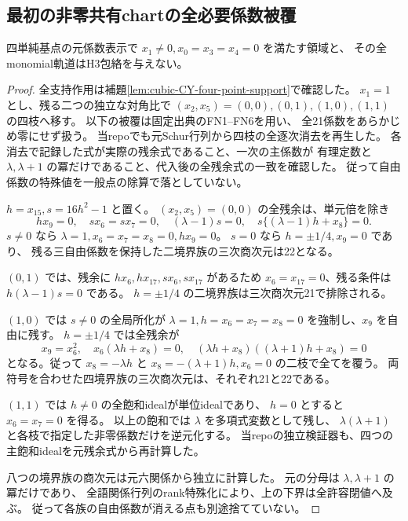 \subsection{最初の非零共有chartの全必要係数被覆}
\label{subsec:cubic-CY-four-point-first-cover}
\begin{theorem}\label{thm:cubic-CY-four-point-first-empty}
四単純基点の元係数表示で $x_1\ne0,x_0=x_3=x_4=0$ を満たす領域と、
その全monomial軌道はH3包絡を与えない。
\end{theorem}
\begin{proof}
全支持作用は補題\ref{lem:cubic-CY-four-point-support}で確認した。
$x_1=1$ とし、残る二つの独立な対角比で
$(x_2,x_5)=(0,0),(0,1),(1,0),(1,1)$ の四枝へ移す。
以下の被覆は固定出典\cite{AS4CYpinned}のFN1--FN6を用い、
全21係数をあらかじめ零にせず扱う。
当repoでも元Schur行列から四枝の全逐次消去を再生した。
各消去で記録した式が実際の残余式であること、一次の主係数が
有理定数と $\lambda,\lambda+1$ の冪だけであること、代入後の全残余式の一致を確認した。
従って自由係数の特殊値を一般点の除算で落としていない。

$h=x_{15},s=16h^2-1$ と置く。
$(x_2,x_5)=(0,0)$ の全残余は、単元倍を除き
\[
 hx_9=0,\quad sx_6=sx_7=0,\quad
 (\lambda-1)s=0,\quad s\{(\lambda-1)h+x_8\}=0.
\]
$s\ne0$ なら $\lambda=1,x_6=x_7=x_8=0,hx_9=0$。
$s=0$ なら $h=\pm1/4,x_9=0$ であり、
残る三自由係数を保持した二境界族の三次商次元は22となる。

$(0,1)$ では、残余に $hx_6,hx_{17},sx_6,sx_{17}$ があるため
$x_6=x_{17}=0$、残る条件は $h(\lambda-1)s=0$ である。
$h=\pm1/4$ の二境界族は三次商次元21で排除される。

$(1,0)$ では $s\ne0$ の全局所化が
$\lambda=1,h=x_6=x_7=x_8=0$ を強制し、$x_9$ を自由に残す。
$h=\pm1/4$ では全残余が
\[
 x_9=x_6^2,\quad x_6(\lambda h+x_8)=0,\quad
 (\lambda h+x_8)((\lambda+1)h+x_8)=0
\]
となる。従って $x_8=-\lambda h$ と
$x_8=-(\lambda+1)h,x_6=0$ の二枝で全てを覆う。
両符号を合わせた四境界族の三次商次元は、それぞれ21と22である。

$(1,1)$ では $h\ne0$ の全飽和idealが単位idealであり、
$h=0$ とすると $x_6=x_7=0$ を得る。
以上の飽和では $\lambda$ を多項式変数として残し、
$\lambda(\lambda+1)$ と各枝で指定した非零係数だけを逆元化する。
当repoの独立検証器も、四つの主飽和idealを元残余式から再計算した。

八つの境界族の商次元は元六関係から独立に計算した。
元の分母は $\lambda,\lambda+1$ の冪だけであり、
全語関係行列のrank特殊化により、上の下界は全許容閉値へ及ぶ。
従って各族の自由係数が消える点も別途捨てていない。


\end{proof}
